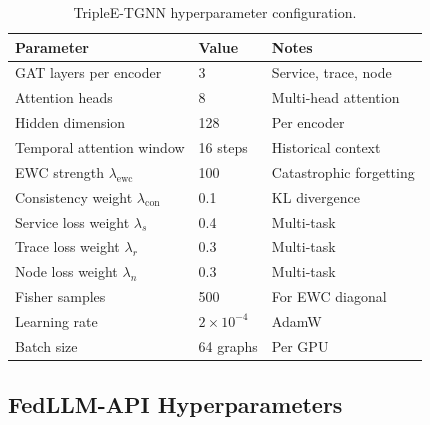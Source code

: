 \begin{table}[htbp]
\centering
\caption{TripleE-TGNN hyperparameter configuration.}
\label{tab:hp_triplee}
\begin{tabular}{lll}
\toprule
Parameter & Value & Notes \\
\midrule
GAT layers per encoder     & 3     & Service, trace, node \\
Attention heads            & 8     & Multi-head attention \\
Hidden dimension           & 128   & Per encoder \\
Temporal attention window  & 16 steps & Historical context \\
EWC strength $\lambda_{\mathrm{ewc}}$ & 100 & Catastrophic forgetting \\
Consistency weight $\lambda_{\mathrm{con}}$ & 0.1 & KL divergence \\
Service loss weight $\lambda_s$ & 0.4 & Multi-task \\
Trace loss weight $\lambda_r$  & 0.3 & Multi-task \\
Node loss weight $\lambda_n$   & 0.3 & Multi-task \\
Fisher samples             & 500   & For EWC diagonal \\
Learning rate              & $2\times10^{-4}$ & AdamW \\
Batch size                 & 64 graphs & Per GPU \\
\bottomrule
\end{tabular}
\end{table}


\subsection{FedLLM-API Hyperparameters}
\label{app:hp_fedllm}

